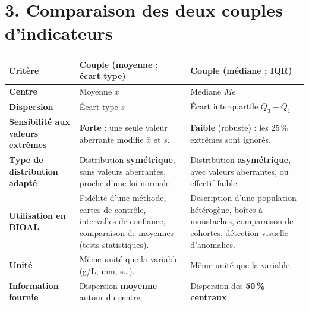 \documentclass[11pt,a4paper]{article}
\begin{document}
\newpage

\section*{3. Comparaison des deux couples d'indicateurs}

\begin{center}
\renewcommand{\arraystretch}{1.5}
\begin{tabularx}{\linewidth}{|p{4cm}|X|X|}
\hline
\textbf{Critère} & \textbf{Couple (moyenne ; écart type)} & \textbf{Couple (médiane ; IQR)} \\
\hline
\textbf{Centre} & Moyenne $\bar{x}$ & Médiane $Me$ \\
\hline
\textbf{Dispersion} & Écart type $s$ & Écart interquartile $Q_3 - Q_1$ \\
\hline
\textbf{Sensibilité aux valeurs extrêmes} & \textbf{Forte} : une seule valeur aberrante modifie $\bar{x}$ et $s$. & \textbf{Faible} (robuste) : les 25\,\% extrêmes sont ignorés. \\
\hline
\textbf{Type de distribution adapté} & Distribution \textbf{symétrique}, sans valeurs aberrantes, proche d'une loi normale. & Distribution \textbf{asymétrique}, avec valeurs aberrantes, ou effectif faible. \\
\hline
\textbf{Utilisation en BIOAL} & Fidélité d'une méthode, cartes de contrôle, intervalles de confiance, comparaison de moyennes (tests statistiques). & Description d'une population hétérogène, boîtes à moustaches, comparaison de cohortes, détection visuelle d'anomalies. \\
\hline
\textbf{Unité} & Même unité que la variable (g/L, mm, s\ldots). & Même unité que la variable. \\
\hline
\textbf{Information fournie} & Dispersion \textbf{moyenne} autour du centre. & Dispersion des \textbf{50\,\% centraux}. \\
\hline
\end{tabularx}
\end{center}
\end{document}
